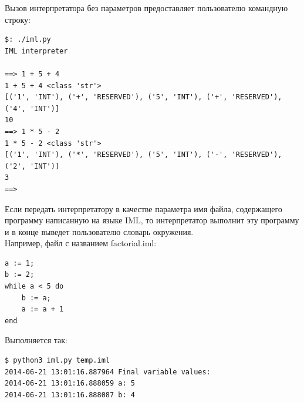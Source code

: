 \documentclass[a4paper,12pt]{article}
\begin{document}
\par Вызов интерпретатора без параметров предоставляет пользователю командную строку:\\
\begin{verbatim}
$: ./iml.py
IML interpreter

==> 1 + 5 + 4
1 + 5 + 4 <class 'str'>
[('1', 'INT'), ('+', 'RESERVED'), ('5', 'INT'), ('+', 'RESERVED'), ('4', 'INT')]
10
==> 1 * 5 - 2
1 * 5 - 2 <class 'str'>
[('1', 'INT'), ('*', 'RESERVED'), ('5', 'INT'), ('-', 'RESERVED'), ('2', 'INT')]
3
==>
\end{verbatim}

\par Если передать интерпретатору в качестве параметра имя файла, содержащего программу написанную на языке IML, то интерпретатор выполнит эту программу и в конце выведет пользователю словарь окружения.\\

Например, файл с названием factorial.iml:
\begin{verbatim}
a := 1;
b := 2;
while a < 5 do
    b := a;
    a := a + 1
end
\end{verbatim}

Выполняется так:

\begin{verbatim}
$ python3 iml.py temp.iml 
2014-06-21 13:01:16.887964 Final variable values:
2014-06-21 13:01:16.888059 a: 5
2014-06-21 13:01:16.888087 b: 4
\end{verbatim}
\end{document}
